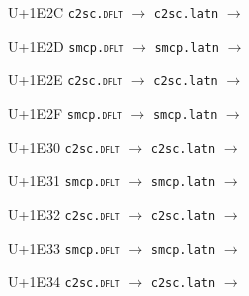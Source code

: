 \documentclass{article}
\begin{document}
\begin{substitutions}
\goodbreak

U+1E2C  \linebreak
    \texttt{c2sc.\textsc{dflt}} $\to$  \linebreak
    \texttt{c2sc.latn} $\to$  

\goodbreak

U+1E2D  \linebreak
    \texttt{smcp.\textsc{dflt}} $\to$  \linebreak
    \texttt{smcp.latn} $\to$  

\goodbreak

U+1E2E  \linebreak
    \texttt{c2sc.\textsc{dflt}} $\to$  \linebreak
    \texttt{c2sc.latn} $\to$  

\goodbreak

U+1E2F  \linebreak
    \texttt{smcp.\textsc{dflt}} $\to$  \linebreak
    \texttt{smcp.latn} $\to$  

\goodbreak

U+1E30  \linebreak
    \texttt{c2sc.\textsc{dflt}} $\to$  \linebreak
    \texttt{c2sc.latn} $\to$  

\goodbreak

U+1E31  \linebreak
    \texttt{smcp.\textsc{dflt}} $\to$  \linebreak
    \texttt{smcp.latn} $\to$  

\goodbreak

U+1E32  \linebreak
    \texttt{c2sc.\textsc{dflt}} $\to$  \linebreak
    \texttt{c2sc.latn} $\to$  

\goodbreak

U+1E33  \linebreak
    \texttt{smcp.\textsc{dflt}} $\to$  \linebreak
    \texttt{smcp.latn} $\to$  

\goodbreak

U+1E34  \linebreak
    \texttt{c2sc.\textsc{dflt}} $\to$  \linebreak
    \texttt{c2sc.latn} $\to$  


\end{substitutions}
\end{document}
